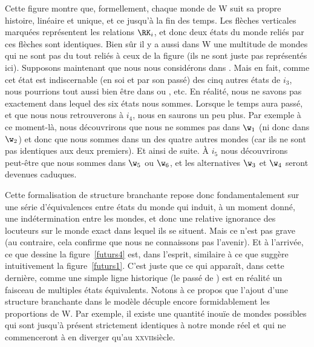 Cette figure montre que, formellement, chaque monde de \Unv W suit sa propre histoire, linéaire et unique, et ce jusqu'à la fin des temps. 
Les flèches verticales marquées  représentent les relations $\RK_i$, et donc deux états du monde reliés par ces flèches sont identiques.  Bien sûr il y a aussi dans \Unv W une multitude de mondes qui ne sont pas du tout reliés à ceux de la figure (ils ne sont juste pas représentés ici).
Supposons maintenant que nous nous considérons dans . Mais en fait, comme cet état est indiscernable (en soi et par son passé) des cinq autres états de $i_3$, nous pourrions tout aussi bien être dans  ou , etc.  En réalité, nous ne savons pas exactement dans lequel des six états nous sommes. Lorsque le temps aura passé, et que nous nous retrouverons à $i_4$, nous en saurons un peu plus. Par exemple à ce moment-là, nous découvrirons que nous ne sommes pas dans $\w_1$ (ni donc dans $\w_2$) et donc que nous sommes dans un des quatre autres mondes (car ils ne sont pas identiques aux deux premiers).  Et ainsi de suite. À $i_5$ nous découvrirons peut-être que nous sommes dans $\w_5$ ou $\w_6$, et les alternatives $\w_3$ et $\w_4$ seront devenues caduques.

Cette formalisation de structure branchante repose donc fondamentalement sur une série d'équivalences entre états du monde qui induit, à un moment donné, une indétermination entre les mondes, et donc une relative ignorance des locuteurs sur le monde exact dans lequel ils se situent. Mais ce n'est pas grave (au contraire, cela confirme que nous ne connaissons pas l'avenir). Et à l'arrivée, ce que dessine la figure~\ref{futurs4} est, dans l'esprit, similaire à ce que suggère intuitivement la figure~\ref{futurs1}.  C'est juste que ce qui apparaît, dans cette dernière, comme une simple ligne historique (le passé de ) est en réalité un faisceau de multiples états équivalents.
Notons à ce propos que l'ajout d'une structure branchante dans le modèle décuple encore formidablement les proportions de \Unv W. Par exemple, il existe une quantité inouïe de mondes possibles qui sont jusqu'à présent strictement identiques à notre monde réel et qui ne commenceront à en diverger qu'au \textsc{xxvii}\ieme siècle. 

